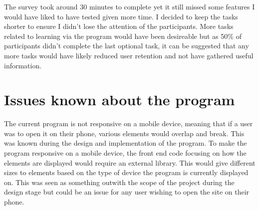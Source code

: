 \documentclass{l4proj}
\begin{document}
The survey took around 30 minutes to complete yet it still missed some features I would have liked to have tested given more time. I decided to keep the tasks shorter to ensure I didn't lose the attention of the participants. More tasks related to learning via the program would have been desireable but as 50\% of participants didn't complete the last optional task, it can be suggested that any more tasks would have likely reduced user retention and not have gathered useful information.

\section{Issues known about the program}
\label{section:issues}
The current program is not responsive on a mobile device, meaning that if a user was to open it on their phone, various elements would overlap and break. This was known during the design and implementation of the program. To make the program responsive on a mobile device, the front end code focusing on how the elements are displayed would require an external library. This would give different sizes to elements based on the type of device the program is currently displayed on. This was seen as something outwith the scope of the project during the design stage but could be an issue for any user wishing to open the site on their phone.
\end{document}
